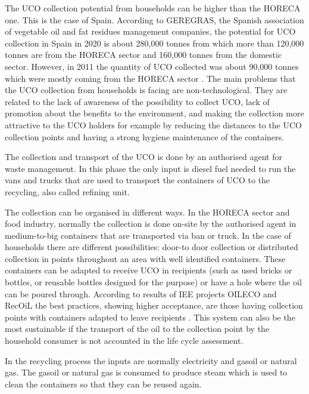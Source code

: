 \documentclass[sustainability,article,submit,moreauthors,pdftex,12pt,a4paper]{mdpi}
\begin{document}
The UCO collection potential from households can be higher than the HORECA one. This is the case of Spain. According to GEREGRAS, the Spanish association of vegetable oil and fat residues management companies, the potential for UCO collection in Spain in 2020 is about 280,000 tonnes from which more than 120,000 tonnes are from the HORECA sector and 160,000 tonnes from the domestic sector. However, in 2011 the quantity of UCO collected was about 90,000 tonnes which were mostly coming from the HORECA sector \cite{IDAEPER}. The main problems that the UCO collection from households is facing are non-technological. They are related to the lack of awareness of the possibility to collect UCO, lack of promotion about the benefits to the environment, and making the collection more attractive to the UCO holders for example by reducing the distances to the UCO collection points and having a strong hygiene maintenance of the containers.
 
The collection and transport of the UCO is done by an authorised agent for waste management. In this phase the only input is diesel fuel needed to run the vans and trucks that are used to transport the containers of UCO to the recycling, also called refining unit.

The collection can be organised in different ways. In the HORECA sector and food industry, normally the collection is done on-site by the authorised agent in medium-to-big containers that are transported via ban or truck. In the case of households there are different possibilities: door-to door collection or distributed collection in points throughout an area with well identified containers. These containers can be adapted to receive UCO in recipients (such as used bricks or bottles, or reusable bottles designed for the purpose) or have a hole where the oil can be poured through. According to results of IEE projects OILECO and RecOiL the best practices, showing higher acceptance, are those having collection points with containers adapted to leave recipients \cite{OILECO2013,RecOil2013}. This system can also be the most sustainable if the transport of the oil to the collection point by the household consumer is not accounted in the life cycle assessment.

In the recycling process the inputs are normally electricity and gasoil or natural gas. The gasoil or natural gas is consumed to produce steam which is used to clean the containers so that they can be reused again.
\end{document}
